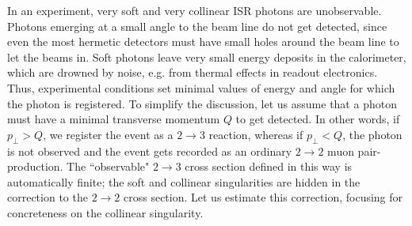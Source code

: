 \documentclass{ws-procs9x6}
\begin{document}
In an experiment, very soft and very collinear ISR photons are unobservable. Photons emerging at a small angle to the beam line do not get detected, since even the most hermetic detectors must have small holes around the beam line to let the beams in. Soft photons leave very small energy deposits in the calorimeter, which are drowned by noise, e.g. from thermal effects in readout electronics. Thus, experimental conditions set minimal values of energy and angle for which the photon is registered. To simplify the discussion, let us assume that a photon must have a minimal transverse momentum $Q$ to get detected. In other words, if $p_\perp>Q$, we register the event as a $2\to 3$ reaction, whereas if $p_\perp<Q$, the photon is not observed and the event gets recorded as an ordinary $2\to 2$ muon pair-production. The ``observable" $2\to3$ cross section defined in this way is automatically finite; the soft and collinear singularities are hidden in the correction to the $2\to2$ cross section. Let us estimate this correction, focusing for concreteness on the collinear singularity.
\end{document}
